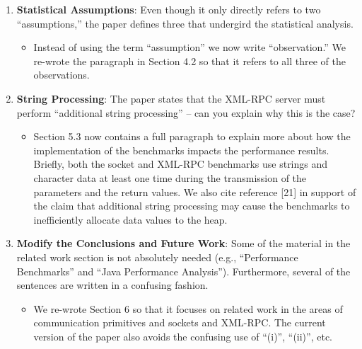 \documentclass[11pt]{article}
\begin{document}
\begin{enumerate}
\begin{itemize}
    \end{itemize}

  \item {\bf Statistical Assumptions}: Even though it only directly
    refers to two ``assumptions,'' the paper defines three that
    undergird the statistical analysis.

    \begin{itemize}
      
      \item Instead of using the term ``assumption'' we now write
        ``observation.'' We re-wrote the paragraph in Section
        4.2 so that it refers to all three of the observations.
        
    \end{itemize}

  \item {\bf String Processing}: The paper states that the XML-RPC
    server must perform ``additional string processing'' -- can you
    explain why this is the case?

    \begin{itemize}
      
      \item Section 5.3 now contains a full paragraph to explain more
        about how the implementation of the benchmarks impacts the
        performance results.  Briefly, both the socket and XML-RPC
        benchmarks use strings and character data at least one time
        during the transmission of the parameters and the return
        values.  We also cite reference [21] in support of the claim
        that additional string processing may cause the benchmarks to
        inefficiently allocate data values to the heap.
        
    \end{itemize}

\newpage

  \item {\bf Modify the Conclusions and Future Work}: Some of the
    material in the related work section is not absolutely needed
    (e.g., ``Performance Benchmarks'' and ``Java Performance
    Analysis'').  Furthermore, several of the sentences are written in
    a confusing fashion.

    \begin{itemize}
      
      \item We re-wrote Section 6 so that it focuses on related work
        in the areas of communication primitives and sockets and
        XML-RPC.  The current version of the paper also avoids the
        confusing use of ``(i)'', ``(ii)'', etc.
        

\end{itemize}
\end{enumerate}
\end{document}
